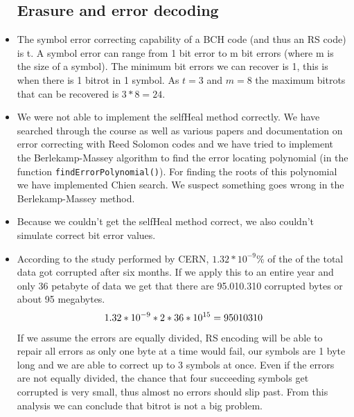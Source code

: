 \documentclass[12pt,a4paper,oneside]{article}
\begin{document}
\begin{itemize}
\subsection*{Erasure and error decoding}
    \item The symbol error correcting capability of a BCH code (and thus an RS code) is t. A symbol error can range from 1 bit error to m bit errors (where m is the size of a symbol). The minimum bit errors we can recover is 1, this is when there is 1 bitrot in 1 symbol. As $t = 3$ and $m = 8$ the maximum bitrots that can be recovered is $3 * 8 = 24$.\par
    \item We were not able to implement the selfHeal method correctly. We have searched through the course as well as various papers and documentation on error correcting with Reed Solomon codes and we have tried to implement the Berlekamp-Massey algorithm to find the error locating polynomial (in the function \verb|findErrorPolynomial()|). For finding the roots of this polynomial we have implemented Chien search. We suspect something goes wrong in the Berlekamp-Massey method.
    \item Because we couldn't get the selfHeal method correct, we also couldn't simulate correct bit error values.
    \item According to the study performed by CERN, $1.32*10^{-9}$\% of the of the total data got corrupted after six months. If we apply this to an entire year and only 36 petabyte of data we get that there are 95.010.310 corrupted bytes or about 95 megabytes.
    \begin{equation*}
        \centering
        1.32*10^{-9} * 2 * 36 * 10^{15} = 95010310
    \end{equation*}
If we assume the errors are equally divided, RS encoding will be able to repair all errors as only one byte at a time would fail, our symbols are 1 byte long and we are able to correct up to 3 symbols at once. Even if the errors are not equally divided, the chance that four succeeding symbols get corrupted is very small, thus almost no errors should slip past. From this analysis we can conclude that bitrot is not a big problem.



\end{itemize}
\end{document}

